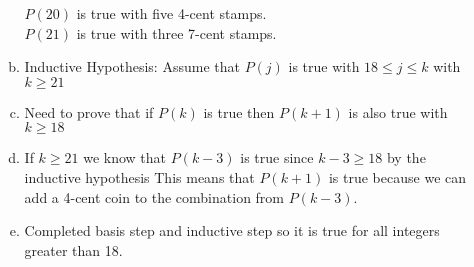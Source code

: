 \begin{itemize}
\begin{enumerate}[a.]
                    $P(20)$ is true with five 4-cent stamps. \\
                    $P(21)$ is true with three 7-cent stamps.
              \item Inductive Hypothesis: Assume that $P(j)$ is true with $18 \leq j \leq k$ with $k \geq 21$
              \item Need to prove that if $P(k)$ is true then $P(k+1)$ is also true with $k \geq 18$
              \item If $k \geq 21$ we know that $P(k-3)$ is true since $k-3 \geq 18$ by the inductive hypothesis
                    This means that $P(k+1)$ is true because we can add a 4-cent coin to the combination from $P(k-3)$.
              \item  Completed basis step and inductive step so it is true for all integers greater than 18.
          \end{enumerate}

\end{itemize}
